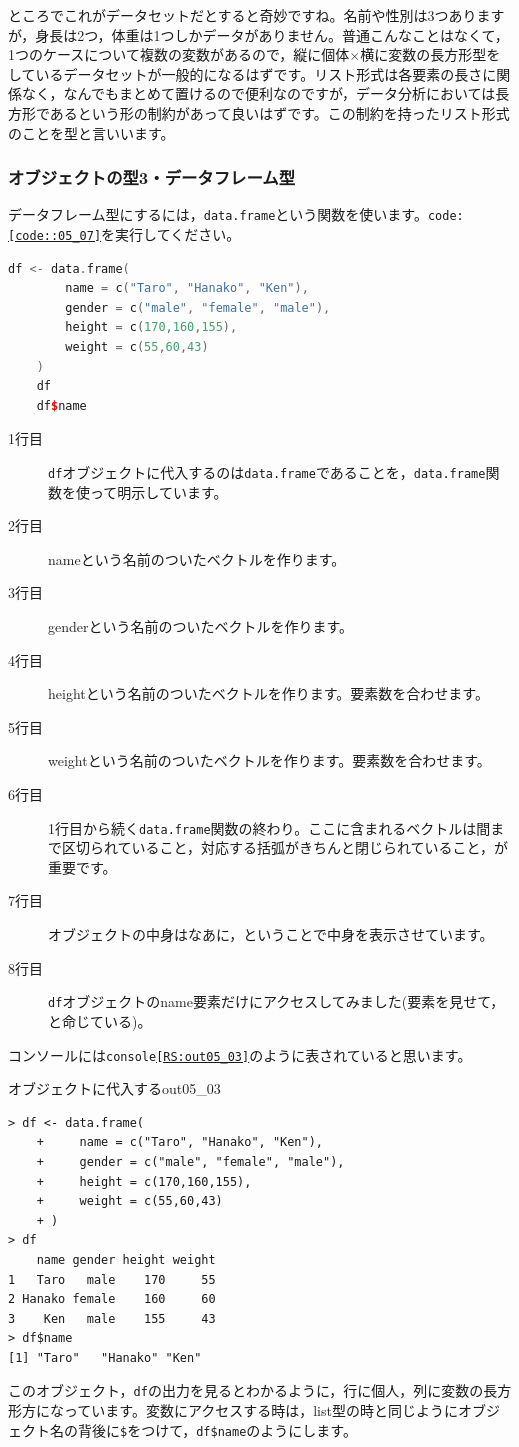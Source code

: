 \documentclass{ltjbook}
\begin{document}
ところでこれがデータセットだとすると奇妙ですね。名前や性別は3つありますが，身長は2つ，体重は1つしかデータがありません。普通こんなことはなくて，1つのケースについて複数の変数があるので，縦に個体$\times$横に変数の長方形型をしているデータセットが一般的になるはずです。リスト形式は各要素の長さに関係なく，なんでもまとめて置けるので便利なのですが，データ分析においては長方形であるという形の制約があって良いはずです。この制約を持ったリスト形式のことを型と言いいます。
\subsubsection{オブジェクトの型3・データフレーム型}
データフレーム型にするには，\texttt{data.frame}という関数を使います。\texttt{code:\ref{code::05_07}}を実行してください。
\begin{lstlisting}[language=c++,label={code::05_07},caption={データフレーム型}]
	df <- data.frame(
		name = c("Taro", "Hanako", "Ken"),
		gender = c("male", "female", "male"),
		height = c(170,160,155),
		weight = c(55,60,43)
	)
	df
	df$name
\end{lstlisting}
\begin{description}
    \item[1行目] \texttt{df}オブジェクトに代入するのは\texttt{data.frame}であることを，\texttt{data.frame}関数を使って明示しています。
	\item[2行目] nameという名前のついたベクトルを作ります。
	\item[3行目] genderという名前のついたベクトルを作ります。
	\item[4行目] heightという名前のついたベクトルを作ります。要素数を合わせます。
	\item[5行目] weightという名前のついたベクトルを作ります。要素数を合わせます。
	\item[6行目] 1行目から続く\texttt{data.frame}関数の終わり。ここに含まれるベクトルは間まで区切られていること，対応する括弧がきちんと閉じられていること，が重要です。
	\item[7行目] オブジェクトの中身はなあに，ということで中身を表示させています。
	\item[8行目] \texttt{df}オブジェクトのname要素だけにアクセスしてみました(要素を見せて，と命じている)。 
\end{description}
コンソールには\texttt{console\ref{RS:out05_03}}のように表されていると思います。
\begin{Rscreen}{オブジェクトに代入する}{out05_03}
	\begin{verbatim}
> df <- data.frame(
	+     name = c("Taro", "Hanako", "Ken"),
	+     gender = c("male", "female", "male"),
	+     height = c(170,160,155),
	+     weight = c(55,60,43)
	+ )
> df
	name gender height weight
1   Taro   male    170     55
2 Hanako female    160     60
3    Ken   male    155     43
> df$name
[1] "Taro"   "Hanako" "Ken"
\end{verbatim}
\end{Rscreen}
このオブジェクト，\texttt{df}の出力を見るとわかるように，行に個人，列に変数の長方形方になっています。変数にアクセスする時は，list型の時と同じようにオブジェクト名の背後に\verb|$|をつけて，\verb|df$name|のようにします。
\end{document}
